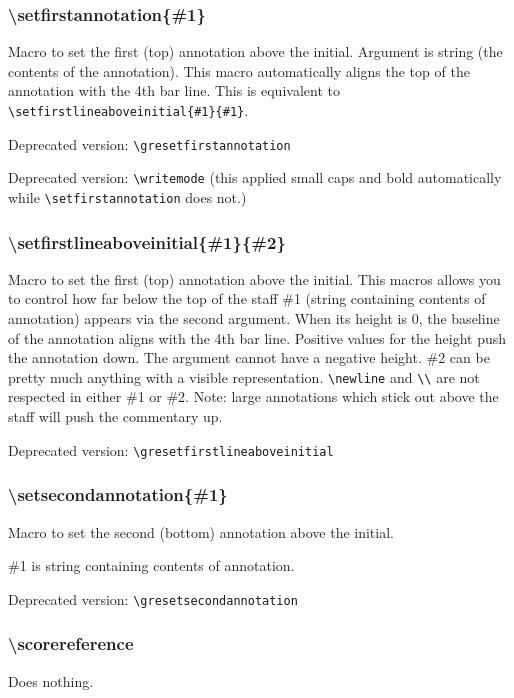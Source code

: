 \subsubsection*{\textbackslash setfirstannotation\{\#1\}}
Macro to set the first (top) annotation above the initial.  Argument
is string (the contents of the annotation).  This macro automatically
aligns the top of the annotation with the 4th bar line.  This is
equivalent to \verb=\setfirstlineaboveinitial{#1}{#1}=.

\smallskip\indent Deprecated version: \verb=\gresetfirstannotation=

\smallskip\indent Deprecated version: \verb=\writemode= (\nb this
applied small caps and bold automatically while
\verb=\setfirstannotation= does
not.)%

\subsubsection*{\textbackslash setfirstlineaboveinitial\{\#1\}\{\#2\}}
Macro to set the first (top) annotation above the initial.  This
macros allows you to control how far below the top of the staff \#1
(string containing contents of annotation) appears via the second
argument.  When its height is 0, the baseline of the annotation aligns
with the 4th bar line.  Positive values for the height push the
annotation down.  The argument cannot have a negative height.  \#2 can
be pretty much anything with a visible representation.
\verb=\newline= and \verb=\\= are not respected in either \#1 or \#2.
Note: large annotations which stick out above the staff will push the
commentary up.

\smallskip\indent Deprecated version: \verb=\gresetfirstlineaboveinitial=

\subsubsection*{\textbackslash setsecondannotation\{\#1\}}
Macro to set the second (bottom) annotation above the initial.

\#1 is string containing contents of annotation.

\smallskip\indent Deprecated version: \verb=\gresetsecondannotation=

\subsubsection*{\textbackslash scorereference}
Does nothing.

